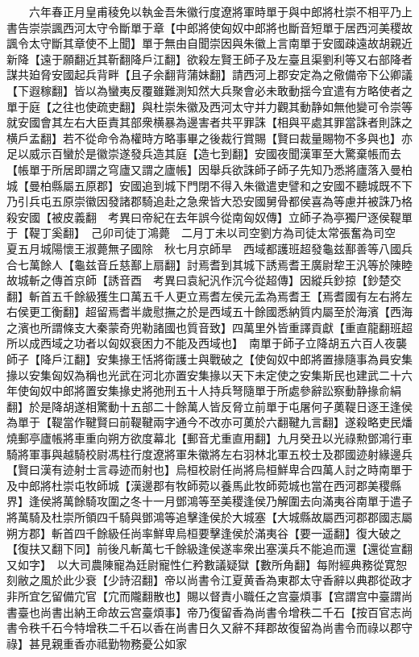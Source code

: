 　　六年春正月皇甫稜免以執金吾朱徽行度遼將軍時單于與中郎將杜崇不相平乃上書告崇崇諷西河太守令斷單于章【中郎將使匈奴中郎將也斷音短單于居西河美稷故諷令太守斷其章使不上聞】單于無由自聞崇因與朱徽上言南單于安國疎遠故胡親近新降【遠于願翻近其靳翻降戶江翻】欲殺左賢王師子及左臺且渠劉利等又右部降者謀共廹脅安國起兵背畔【且子余翻背蒲妹翻】請西河上郡安定為之儆備帝下公卿議【下遐稼翻】皆以為蠻夷反覆雖難測知然大兵聚會必未敢動揺今宜遣有方略使者之單于庭【之往也使疏吏翻】與杜崇朱徽及西河太守并力觀其動静如無他變可令崇等就安國會其左右大臣責其部衆横暴為邊害者共平罪誅【相與平處其罪當誅者則誅之横戶孟翻】若不從命令為權時方略事畢之後裁行賞賜【賢曰裁量賜物不多與也】亦足以威示百蠻於是徽崇遂發兵造其庭【造七到翻】安國夜聞漢軍至大驚棄帳而去【帳單于所居即謂之穹廬又謂之廬帳】因舉兵欲誅師子師子先知乃悉將廬落入曼柏城【曼柏縣屬五原郡】安國追到城下門閉不得入朱徽遣吏譬和之安國不聽城既不下乃引兵屯五原崇徽因發諸郡騎追赴之急衆皆大恐安國舅骨都侯喜為等慮并被誅乃格殺安國【被皮義翻　考異曰帝紀在去年誤今從南匈奴傳】立師子為亭獨尸逐侯鞮單于【鞮丁奚翻】　己卯司徒丁鴻薨　二月丁未以司空劉方為司徒太常張奮為司空　夏五月城陽懷王淑薨無子國除　秋七月京師旱　西域都護班超發龜兹鄯善等八國兵合七萬餘人【龜兹音丘慈鄯上扇翻】討焉耆到其城下誘焉耆王廣尉犂王汎等於陳睦故城斬之傳首京師【誘音酉　考異曰袁紀汎作沉今從超傳】因縱兵鈔掠【鈔楚交翻】斬首五千餘級獲生口萬五千人更立焉耆左侯元孟為焉耆王【焉耆國有左右將左右侯更工衡翻】超留焉耆半歲慰撫之於是西域五十餘國悉納質内屬至於海濱【西海之濱也所謂條支大秦蒙奇兜勒諸國也質音致】四萬里外皆重譯貢獻【重直龍翻班超所以成西域之功者以匈奴衰困力不能及西域也】　南單于師子立降胡五六百人夜襲師子【降戶江翻】安集掾王恬將衛護士與戰破之【使匈奴中郎將置掾隨事為員安集掾以安集匈奴為稱也光武在河北亦置安集掾以天下未定使之安集斯民也建武二十六年使匈奴中郎將置安集掾史將弛刑五十人持兵弩隨單于所處參辭訟察動静掾俞絹翻】於是降胡遂相驚動十五部二十餘萬人皆反脅立前單于屯屠何子薁鞮日逐王逢侯為單于【鞮當作鞬賢曰前鞮鞬兩字通今不改亦可薁於六翻鞬九言翻】遂殺略吏民燔燒郵亭廬帳將車重向朔方欲度幕北【郵音尤重直用翻】九月癸丑以光祿勲鄧鴻行車騎將軍事與越騎校尉馮柱行度遼將軍朱徽將左右羽林北軍五校士及郡國迹射緣邊兵【賢曰漢有迹射士言尋迹而射也】烏桓校尉任尚將烏桓鮮卑合四萬人討之時南單于及中郎將杜崇屯牧師城【漢邊郡有牧師菀以養馬此牧師菀城也當在西河郡美稷縣界】逢侯將萬餘騎攻圍之冬十一月鄧鴻等至美稷逢侯乃解圍去向滿夷谷南單于遣子將萬騎及杜崇所領四千騎與鄧鴻等追擊逢侯於大城塞【大城縣故屬西河郡郡國志屬朔方郡】斬首四千餘級任尚率鮮卑烏桓要擊逢侯於滿夷谷【要一遥翻】復大破之【復扶又翻下同】前後凡斬萬七千餘級逢侯遂率衆出塞漢兵不能追而還【還從宣翻又如字】　以大司農陳寵為廷尉寵性仁矜數議疑獄【數所角翻】每附經典務從寛恕刻敝之風於此少衰【少詩沼翻】帝以尚書令江夏黄香為東郡太守香辭以典郡從政才非所宜乞留備宂官【宂而隴翻散也】賜以督責小職任之宫臺煩事【宫謂宫中臺謂尚書臺也尚書出納王命故云宫臺煩事】帝乃復留香為尚書令增秩二千石【按百官志尚書令秩千石今特增秩二千石以香在尚書日久又辭不拜郡故復留為尚書令而祿以郡守祿】甚見親重香亦祗勤物務憂公如家

